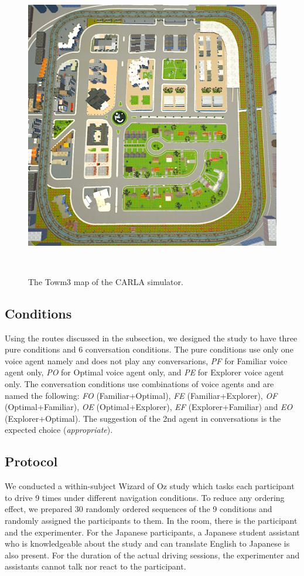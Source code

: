 \begin{figure}
\centering
  \includegraphics[scale=0.3]{figures/s2-carla-map.PNG}
  \caption{The Towm3 map of the CARLA simulator.}~\label{fig:s2-carla-map}
\end{figure}

\subsection{Conditions}
Using the routes discussed in the  subsection, we designed the study to have three pure conditions and 6 conversation conditions. The pure conditions use only one voice agent namely and does not play any conversarions, \textit{PF} for Familiar voice agent only, \textit{PO} for Optimal voice agent only, and \textit{PE} for Explorer voice agent only. The conversation conditions use combinations of voice agents and are named the following: \textit{FO} (Familiar+Optimal), \textit{FE} (Familiar+Explorer), \textit{OF} (Optimal+Familiar), \textit{OE} (Optimal+Explorer), \textit{EF} (Explorer+Familiar) and \textit{EO} (Explorer+Optimal). The suggestion of the 2nd agent in conversations is the expected choice (\textit{appropriate}).

\subsection{Protocol}
We conducted a within-subject Wizard of Oz study which tasks each participant to drive 9 times under different navigation conditions. To reduce any ordering effect, we prepared 30 randomly ordered sequences of the 9 conditions and randomly assigned the participants to them. 
In the room, there is the participant and the experimenter. For the Japanese participants, a Japanese student assistant who is knowledgeable about the study and can translate English to Japanese is also present. For the duration of the actual driving sessions, the experimenter and assistants cannot talk nor react to the participant. 

